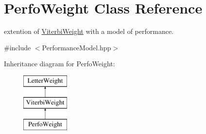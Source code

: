 \hypertarget{classPerfoWeight}{}\section{Perfo\+Weight Class Reference}
\label{classPerfoWeight}


extention of \mbox{\hyperlink{classViterbiWeight}{Viterbi\+Weight}} with a model of performance.  




{\ttfamily \#include $<$Performance\+Model.\+hpp$>$}

Inheritance diagram for Perfo\+Weight\+:\begin{figure}[H]
\begin{center}
\leavevmode
\includegraphics[height=3.000000cm]{classPerfoWeight}
\end{center}
\end{figure}
